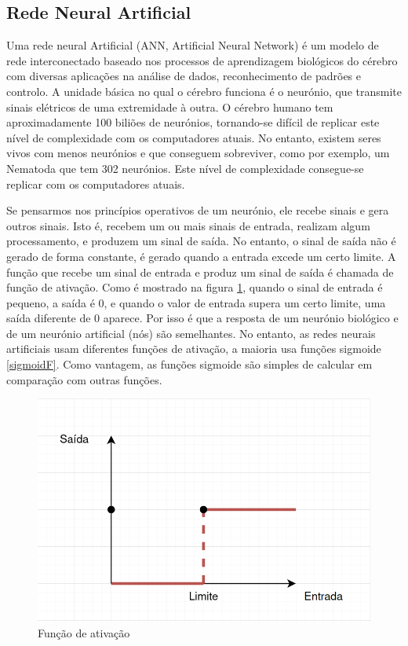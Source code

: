 \subsection{Rede Neural Artificial}

Uma rede neural Artificial (ANN, Artificial Neural Network) é um modelo de rede interconectado baseado nos processos de aprendizagem biológicos do cérebro com diversas aplicações na análise de dados, reconhecimento de padrões e controlo. 
A unidade básica no qual o cérebro funciona é o neurónio, que transmite sinais elétricos de uma extremidade à outra. O cérebro humano tem aproximadamente 100 biliões de neurónios, tornando-se difícil de replicar este nível de complexidade com os computadores atuais. No entanto, existem seres vivos com menos neurónios e que conseguem sobreviver, como por exemplo, um Nematoda que tem 302 neurónios. Este nível de complexidade consegue-se replicar com os computadores atuais.

Se pensarmos nos princípios operativos de um neurónio, ele recebe sinais e gera outros sinais. Isto é, recebem um ou mais sinais de entrada, realizam algum processamento, e produzem um sinal de saída. No entanto, o sinal de saída não é gerado de forma constante, é gerado quando a entrada excede um certo limite. A função que recebe um sinal de entrada e produz um sinal de saída é chamada de função de ativação. Como é mostrado na figura \ref{ativaçãoF}, quando o sinal de entrada é pequeno, a saída é 0, e quando o valor de entrada supera um certo limite, uma saída diferente de 0 aparece. Por isso é que a resposta de um neurónio biológico e de um neurónio artificial (nós) são semelhantes. No entanto, as redes neurais artificiais usam diferentes funções de ativação, a maioria usa funções sigmoide \ref{sigmoidF}. Como vantagem, as funções sigmoide são simples de calcular em comparação com outras funções.



\begin{figure}[H]
\centering
\includegraphics[scale=0.4]{figs/activation_function}
\caption{Função de ativação }\label{ativaçãoF}
\end{figure}


